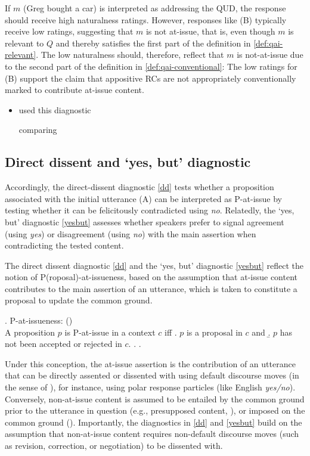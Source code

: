 \documentclass[times,linguex,xcolor]{glossa}
\begin{document}
      If $m$ (Greg bought a car) is interpreted as addressing the QUD, the response should receive high naturalness ratings. However, responses like (B) typically receive low ratings, suggesting that $m$ is not at-issue, that is, even though $m$ is relevant to $Q$ and thereby satisfies the first part of the definition in \ref{def:qai-relevant}. The low naturalness should, therefore, reflect that $m$ is not-at-issue due to the second part of the definition in \ref{def:qai-conventional}: The low ratings for (B) support the claim that appositive RCs are not appropriately conventionally marked to contribute at-issue content.

      \begin{itemize}
        \item \citealt{chen_presuppositions_2024} used this diagnostic 

        comparing  

      \end{itemize}

  \subsection{Direct dissent and `yes, but' diagnostic}
    Accordingly, the direct-dissent diagnostic \ref{dd} tests whether a proposition associated with the initial utterance (A) can be interpreted as P-at-issue by testing whether it can be felicitously contradicted using \emph{no}. Relatedly, the `yes, but' diagnostic \ref{yesbut} assesses whether speakers prefer to signal agreement (using \emph{yes}) or disagreement (using \emph{no}) with the main assertion when contradicting the tested content.

    The direct dissent diagnostic \ref{dd} and the `yes, but' diagnostic \ref{yesbut} reflect the notion of P(roposal)-at-issueness, based on the assumption that at-issue content contributes to the main assertion of an utterance, which is taken to constitute a proposal to update the common ground.

     \ex. P-at-issueness: \hfill (\citealt{koev_apposition_2013,koev_notions_2018})\\
      A proposition $p$ is P-at-issue in a context $c$ iff
      \a. $p$ is a proposal in $c$ and
      \b. $p$ has not been accepted or rejected in $c$.
      \z.
    \z.

    Under this conception, the at-issue assertion is the contribution of an utterance that can be directly assented or dissented with using default discourse moves (in the sense of \citealt{farkas_reacting_2010}), for instance, using polar response particles (like English \emph{yes/no}). Conversely, non-at-issue content is assumed to be entailed by the common ground prior to the utterance in question (e.g., presupposed content, \citealt{stalnaker_presuppositions_1973,stalnaker_common_2002}), or imposed on the common ground (\citealt{murray_varieties_2014,anderbois_at-issue_2015}). Importantly, the diagnostics in \ref{dd} and \ref{yesbut} build on the assumption that non-at-issue content requires non-default discourse moves (such as revision, correction, or negotiation) to be dissented with.
\end{document}
